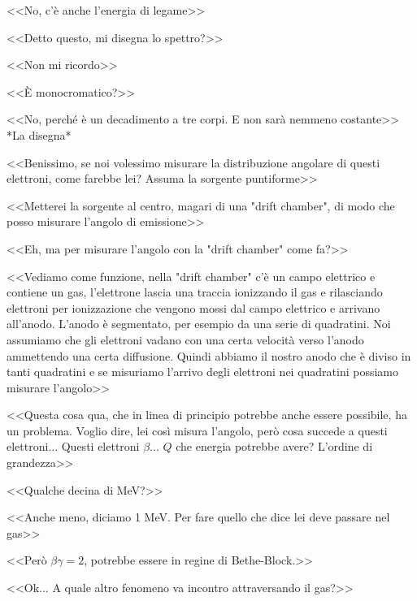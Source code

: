 \documentclass[../main.tex]{subfiles}
\begin{document}
\begin{enumerate}
{\begin{flushright}
        <<No, c'è anche l'energia di legame>>
        \end{flushright}
        <<Detto questo, mi disegna lo spettro?>>
        \begin{flushright}
        <<Non mi ricordo>>
        \end{flushright}
        <<È monocromatico?>>
        \begin{flushright}
        <<No, perché è un decadimento a tre corpi. E non sarà nemmeno costante>>\\
        *La disegna*
        \end{flushright}
        <<Benissimo, se noi volessimo misurare la distribuzione angolare di questi elettroni, come farebbe lei? Assuma la sorgente puntiforme>>
        \begin{flushright}
        <<Metterei la sorgente al centro, magari di una "drift chamber", di modo che posso misurare l'angolo di emissione>>
        \end{flushright}
        <<Eh, ma per misurare l'angolo con la "drift chamber" come fa?>>
        \begin{flushright}
        <<Vediamo come funzione, nella "drift chamber" c'è un campo elettrico e contiene un gas, l'elettrone lascia una traccia ionizzando il gas e rilasciando elettroni per ionizzazione che vengono mossi dal campo elettrico e arrivano all'anodo. L'anodo è segmentato, per esempio da una serie di quadratini. Noi assumiamo che gli elettroni vadano con una certa velocità verso l'anodo ammettendo una certa diffusione. Quindi abbiamo il nostro anodo che è diviso in tanti quadratini e se misuriamo l'arrivo degli elettroni nei quadratini possiamo misurare l'angolo>>
        \end{flushright}
        <<Questa cosa qua, che in linea di principio potrebbe anche essere possibile, ha un problema. Voglio dire, lei così misura l'angolo, però cosa succede a questi elettroni... Questi elettroni $\beta$... $Q$ che energia potrebbe avere? L'ordine di grandezza>>
        \begin{flushright}
        <<Qualche decina di MeV?>>
        \end{flushright}
        <<Anche meno, diciamo 1 MeV. Per fare quello che dice lei deve passare nel gas>>
        \begin{flushright}
        <<Però $\beta\gamma = 2$, potrebbe essere in regine di Bethe-Block.>>
        \end{flushright}
        <<Ok... A quale altro fenomeno va incontro attraversando il gas?>>
}
\end{enumerate}
\end{document}
